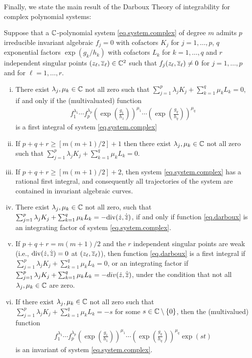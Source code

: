 Finally, we state the main result of the Darboux Theory of integrability for complex polynomial systems:
\begin{theorem}
\label{th.darboux}
Suppose that a $\mathbb{C}$-polynomial system \eqref{eq.system.complex} of degree $m$ admits $p$ irreducible invariant algebraic $f_j=0$ with cofactors $K_j$ for $j=1,\dots,p$, $q$ exponential factors $\exp(g_k/h_k)$ with cofactors $L_k$ for $k=1,\dots,q$ and $r$ independent singular points $(z_\ell,\overline{z}_\ell)\in\mathbb{C}^2$ such that $f_j(z_\ell,\overline{z}_\ell)\ne0$ for $j=1,\dots,p$ and for $\ell=1,\dots,r$.
\begin{enumerate}[(i)]
\item
There exist $\lambda_j,\mu_k\in\mathbb{C}$ not all zero such that $\sum_{j=1}^p \lambda_jK_j+\sum_{k=1}^q \mu_kL_k=0$, if and only if the (multivaluated) function
\begin{align}
f_1^{\lambda_1}\cdots f_p^{\lambda_p}\left(\exp\left(\frac{g_1}{h_1}\right)\right)^{\mu_1}\cdots\left(\exp\left(\frac{g_q}{h_q}\right)\right)^{\mu_q}
\label{eq.darboux}
\end{align}
is a first integral of system \eqref{eq.system.complex}
\item
If $p+q+r\ge[m(m+1)/2]+1$ then there exist $\lambda_j,\mu_k\in\mathbb{C}$ not all zero such that $\sum_{j=1}^p \lambda_jK_j+\sum_{k=1}^q \mu_kL_k=0$.
\item
If $p+q+r\ge[m(m+1)/2]+2$, then system \eqref{eq.system.complex} has a rational first integral, and consequently all trajectories of the system are contained in invariant algebraic curves.
\item
There exist $\lambda_j,\mu_k\in\mathbb{C}$ not all zero, such that $\sum_{j=1}^p \lambda_jK_j+\sum_{k=1}^q \mu_kL_k=-\mathrm{div}(\dot z,\dot{\overline{z}})$, if and only if function \eqref{eq.darboux} is an integrating factor of system \eqref{eq.system.complex}.
\item
If $p+q+r=m(m+1)/2$ and the $r$ independent singular points are weak (i.e., $\mathrm{div}(\dot z,\dot{\overline{z}})=0$ at $(z_\ell,\overline{z}_\ell)$), then function \eqref{eq.darboux} is a first integral if $\sum_{j=1}^p \lambda_jK_j+\sum_{k=1}^q \mu_kL_k=0$, or an integrating factor if $\sum_{j=1}^p \lambda_jK_j+\sum_{k=1}^q \mu_kL_k=-div(\dot z,\dot {\overline{z}})$, under the condition that not all $\lambda_j,\mu_k\in\mathbb{C}$ are zero.
\item
If there exist $\lambda_j,\mu_k\in\mathbb{C}$ not all zero such that $\sum_{j=1}^p \lambda_jK_j+\sum_{k=1}^q \mu_kL_k=-s$ for some $s\in\mathbb{C}\setminus\{0\}$, then the (multivalued) function
\begin{align*}
f_1^{\lambda_1}\cdots f_p^{\lambda_p}\left(\exp\left(\frac{g_1}{h_1}\right)\right)^{\mu_1}\cdots\left(\exp\left(\frac{g_q}{h_q}\right)\right)^{\mu_q}\exp(st)
\end{align*}
is an invariant of system \eqref{eq.system.complex}.
\end{enumerate}
\end{theorem}
 
